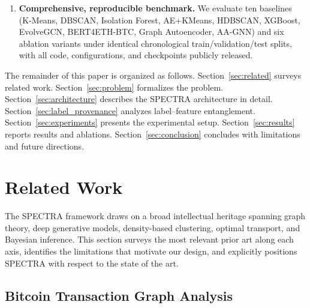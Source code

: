 \documentclass[journal]{IEEEtran}
\begin{document}
\begin{enumerate}[leftmargin=*, label=\textbf{C\arabic*}]
  \item \textbf{Comprehensive, reproducible benchmark.}
    We evaluate ten baselines (K-Means, DBSCAN, Isolation Forest,
    AE+KMeans, HDBSCAN, XGBoost, EvolveGCN, BERT4ETH-BTC, Graph
    Autoencoder, AA-GNN) and six ablation variants under identical
    chronological train/validation/test splits, with all code, configurations,
    and checkpoints publicly released.

\end{enumerate}

The remainder of this paper is organized as follows.
Section~\ref{sec:related} surveys related work.
Section~\ref{sec:problem} formalizes the problem.
Section~\ref{sec:architecture} describes the SPECTRA architecture in detail.
Section~\ref{sec:label_provenance} analyzes label--feature entanglement.
Section~\ref{sec:experiments} presents the experimental setup.
Section~\ref{sec:results} reports results and ablations.
Section~\ref{sec:conclusion} concludes with limitations and future directions.





\section{Related Work}
\label{sec:related_work}

The SPECTRA framework draws on a broad intellectual heritage spanning graph
theory, deep generative models, density-based clustering, optimal transport,
and Bayesian inference.  This section surveys the most relevant prior art along
each axis, identifies the limitations that motivate our design, and explicitly
positions SPECTRA with respect to the state of the art.

\subsection{Bitcoin Transaction Graph Analysis}
\label{subsec:bitcoin_graph}
\end{document}
